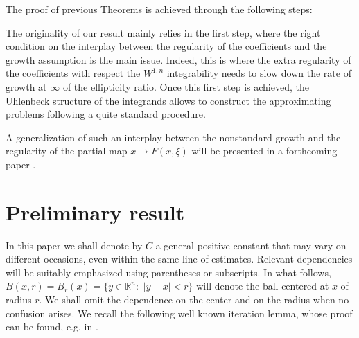 \documentclass[12pt]{amsart}
\theoremstyle{definition}
\numberwithin{equation}{section}
\def\R{{\mathbb R}}
\def\R{{\mathbb R}}
\numberwithin{equation}{section}
\begin{document}
{
The proof of previous Theorems is achieved
through the following steps:
The originality of our result mainly relies in the first step, where  the right condition on the interplay between the regularity of the coefficients and the growth assumption is the main issue. Indeed, this is where  the extra regularity of the coefficients  with respect the $W^{1,n}$ integrability needs to slow down the rate of growth  at $\infty$ of the ellipticity ratio.
Once this first step is achieved, the Uhlenbeck structure of the integrands allows to construct the approximating problems following a quite standard procedure.

A generalization of such an interplay between the nonstandard growth and the regularity of the partial map $x\to F(x,\xi)$ will be presented in a forthcoming paper \cite{EPdN25}.


\section{Preliminary result}
\medskip
In this paper we shall denote by $C$  a
general positive constant that may vary on different occasions, even within the
same line of estimates.
Relevant dependencies  will be suitably emphasized using
parentheses or subscripts.  In what follows, $B(x,r)=B_r(x)=\{y\in \R^n:\,\, |y-x|<r\}$ will denote the ball centered at $x$ of radius $r$.
We shall omit the dependence on the center and on the radius when no confusion arises.
We recall the following well known iteration lemma, whose
proof can be found, e.g. in \cite[Lemma 6.1, p.191]{Giusti}.

}
\end{document}
